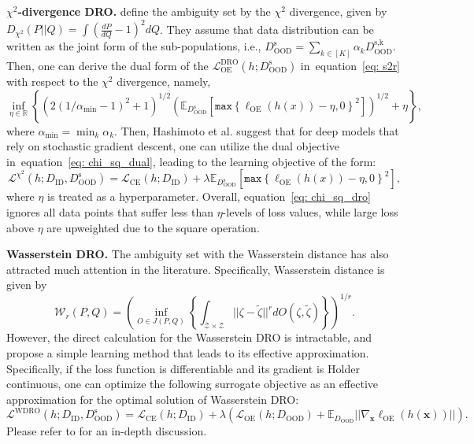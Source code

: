 \documentclass{article} \usepackage{iclr2022_conference,times}
\def\eqref#1{equation~\ref{#1}}
\begin{document}
\textbf{$\chi^2$-divergence DRO.} \cite{hashimoto2018fairness} define the ambiguity set by the $\chi^2$ divergence, given by $D_{\chi^2}(P\lvert\rvert Q)=\int\left(\frac{dP}{dQ}-1\right)^2 dQ$. They assume that data distribution can be written as the joint form of the sub-populations, i.e., $D_\text{OOD}^\text{s}=\sum_{k\in[K]}\alpha_k D_\text{OOD}^\text{s,k}$. Then, one can derive the dual form of the $\mathcal{L}_\text{OE}^\text{DRO}(h;D_\text{OOD}^\text{s})$ in~\eqref{eq: s2r} with respect to the $\chi^2$ divergence, namely,
\begin{equation}
    \inf_{\eta\in\mathbb{R}} \left\{(2(1/\alpha_\text{min} - 1)^2 + 1)^{1/2} \left(\mathbb{E}_{D_\text{OOD}^\text{s}}\left[\texttt{max}\left\{\ell_\text{OE}(h(x))-\eta, 0\right\}^2\right]\right)^{1/2} + \eta\right\}, \label{eq: chi_sq_dual}
\end{equation}
where $\alpha_\text{min}=\min_k \alpha_k$. Then, Hashimoto et al. suggest that for  deep models that rely on stochastic gradient descent, one can utilize the dual objective in~\eqref{eq: chi_sq_dual}, leading to the learning objective of the form:
\begin{equation}
    {\mathcal{L}}^{\chi^2}(h;D_\text{ID}, D_\text{OOD}^\text{s})={\mathcal{L}}_\text{CE}(h; D_\text{ID}) + \lambda  \mathbb{E}_{D_\text{OOD}^\text{s}} \left[ \texttt{max} \left\{\ell_\text{OE}(h(x))-\eta, 0\right\}^2\right], \label{eq: chi_sq_dro}
\end{equation}
where $\eta$ is treated as a hyperparameter. Overall, \eqref{eq: chi_sq_dro} ignores all data points that suffer less than $\eta$-levels of loss values, while large loss above $\eta$ are upweighted due to the square operation. 


\textbf{Wasserstein DRO.} The ambiguity set with the Wasserstein distance has also attracted much attention in the literature. Specifically, Wasserstein distance is given by 
\begin{equation}
    \mathcal{W}_r(P,Q)=\left(\inf_{O\in J (P,Q)} \left\{\int_{\mathcal{Z}\times\mathcal{Z}} \lvert\lvert\zeta - \tilde{\zeta}\rvert\rvert^r dO(\zeta, \tilde{\zeta}) \right\}\right)^{1/r}.
\end{equation}
However, the direct calculation for the Wasserstein DRO is intractable, and \cite{KwonKWP20} propose a simple learning method that leads to its effective approximation. Specifically, if the loss function is differentiable and its gradient is Holder continuous, one can optimize the following surrogate objective as an effective approximation for the optimal solution of Wasserstein DRO:
\begin{equation}
    {\mathcal{L}}^\text{WDRO}(h;D_\text{ID}, D_\text{OOD}^\text{s})={\mathcal{L}}_\text{CE}(h; D_\text{ID}) + \lambda  \left({\mathcal{L}}_\text{OE}(h; D_\text{OOD}) + \mathbb{E}_{D_\text{OOD}} \lvert\lvert \nabla_{\boldsymbol{x}} \ell_\text{OE}  (h(\boldsymbol{x})) \rvert\rvert\right). \label{eq: wdro}
\end{equation}
Please refer to \citep{KwonKWP20} for an in-depth discussion. 
\end{document}
